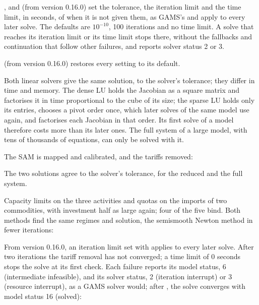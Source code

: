 \begin{optdesc}
\item[\optarg{tol}{erance}{\#}],  and
 (from version 0.16.0) set the tolerance, the
iteration limit and the time limit, in seconds, of  when
it is not given them, as GAMS's  and  apply
to every later solve. The defaults are $10^{-10}$, 100 iterations and no time
limit. A solve that reaches its iteration limit or its time limit stops
there, without the fallbacks and continuation that follow other failures,
and reports solver status 2 or 3.

\item[\opt{}{reset}] (from version 0.16.0) restores every setting to its
default.
\end{optdesc}


Both linear solvers give the same solution, to the solver's tolerance; they
differ in time and memory. The dense LU holds the Jacobian as a square matrix
and factorises it in time proportional to the cube of its size; the sparse LU
holds only its entries, chooses a pivot order once, which later solves of the
same model use again, and factorises each Jacobian in that order. Its first
solve of a model therefore costs more than its later ones. The full system of a
large model, with tens of thousands of equations, can only be solved with it.

The SAM is mapped and calibrated, and the tariffs removed:


The two solutions agree to the solver's tolerance, for the reduced and the
full system.


Capacity limits on the three activities and quotas on the imports of two
commodities, with investment half as large again; four of the five bind.
Both methods find the same regimes and solution, the semismooth Newton method
in fewer iterations:


From version 0.16.0, an iteration limit set with  applies to
every later solve. After two iterations the tariff removal has not converged;
a time limit of 0 seconds stops the solve at its first check. Each failure
reports its model status, 6 (intermediate infeasible), and its solver status,
2 (iteration interrupt) or 3 (resource interrupt), as a GAMS solver would;
after , the solve converges with model status 16 (solved):

